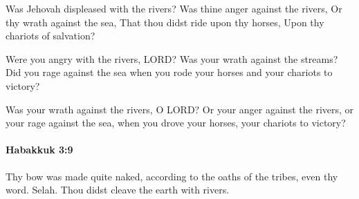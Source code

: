 			\begin{versebox}
					\item[BHS] 
					\item[LXX] 
					\item[ASV] Was Jehovah displeased with the rivers? Was thine anger against the rivers, Or thy wrath against the sea, That thou didst ride upon thy horses, Upon thy chariots of salvation?
					\item[NIV] Were you angry with the rivers, LORD? Was your wrath against the streams? Did you rage against the sea when you rode your horses and your chariots to victory?
					\item[NRSV] Was your wrath against the rivers, O LORD? Or your anger against the rivers, or your rage against the sea, when you drove your horses, your chariots to victory?
			\end{versebox}

		\paragraph{Habakkuk 3:9} %
			\label{HABAKKUK-3-9}

			Thy bow was made quite naked, according to the oaths of the tribes, even thy word. Selah. Thou didst cleave the earth with rivers.

